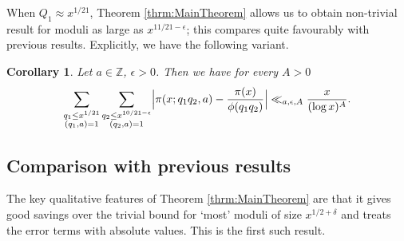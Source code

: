\documentclass[10pt]{amsart}
\theoremstyle{plain}
\newtheorem{crllry}[thrm]{Corollary}
\numberwithin{equation}{section}
\begin{document}
When $Q_1\approx x^{1/21}$, Theorem \ref{thrm:MainTheorem} allows us to obtain non-trivial result for moduli as large as $x^{11/21-\epsilon}$; this compares quite favourably with previous results. Explicitly, we have the following variant.
%
%
%
%
%
%
%
%
\begin{crllry}\label{crllry:1121}
Let $a\in\mathbb{Z}$, $\epsilon>0$. Then we have for every $A>0$
\[
\sum_{\substack{q_1\le  x^{1/21}\\ (q_1,a)=1}}\sum_{\substack{q_2\le x^{10/21-\epsilon} \\ (q_2,a)=1}}\Bigl|\pi(x;q_1q_2,a)-\frac{\pi(x)}{\phi(q_1q_2)}\Bigr|\ll_{a,\epsilon,A}\frac{x}{(\log{x})^A}.
\]
\end{crllry}
%
%
%
%
%
%
%
%
\subsection{Comparison with previous results}
%
%
%
%
The key qualitative features of Theorem \ref{thrm:MainTheorem} are that it gives good savings over the trivial bound for `most' moduli of size $x^{1/2+\delta}$ and treats the error terms with absolute values. This is the first such result.
\end{document}
